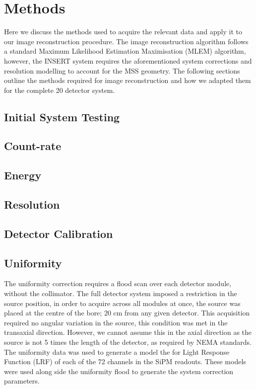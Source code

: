 \section{Methods}
Here we discuss the methods used to acquire the relevant
data and apply it to our image reconstruction procedure.
The image reconstruction algorithm follows a standard
Maximum Likelihood Estimation Maximisation (MLEM) algorithm,
however, the INSERT system requires the aforementioned
system corrections and resolution modelling to account for the MSS geometry. The following sections outline
the methods required for image reconstruction and how we
adapted them for the complete 20 detector system.

\subsection{Initial System Testing}
\subsection{Count-rate} 
\subsection{Energy}
\subsection{Resolution}
\subsection{Detector Calibration}
\subsection{Uniformity}
The uniformity correction requires a flood scan over each
detector module, without the collimator. The full detector
system imposed a restriction in the source position, in order
to acquire across all modules at once, the source was placed
at the centre of the bore; 20 cm from any given detector.
This acquisition required no angular variation in the source,
this condition was met in the transaxial direction. However,
we cannot assume this in the axial direction as the source is
not 5 times the length of the detector, as required by NEMA
standards.
The uniformity data was used to generate a model the for
Light Response Function (LRF) of each of the 72 channels
in the SiPM readouts. These models were used along side the
uniformity flood to generate the system correction parameters.

